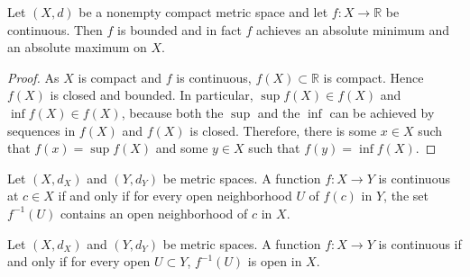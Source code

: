 \documentclass[../main.tex]{subfiles}
\begin{document}
            \begin{theorem} \label{thm:max_min_compact}
                Let \( (X, d) \) be a nonempty compact metric space and let \( f: X \to \mathbb{R} \) be continuous. Then \( f \) is bounded and in fact \( f \) achieves an absolute minimum and an absolute maximum on \( X \).
                
                \begin{proof} 
                    As \( X \) is compact and \( f \) is continuous, \( f(X) \subset \mathbb{R} \) is compact. Hence \( f(X) \) is closed and bounded. In particular, \( \sup f(X) \in f(X) \) and \( \inf f(X) \in f(X) \), because both the \(\sup\) and the \(\inf\) can be achieved by sequences in \( f(X) \) and \( f(X) \) is closed. Therefore, there is some \( x \in X \) such that \( f(x) = \sup f(X) \) and some \( y \in X \) such that \( f(y) = \inf f(X) \).
                \end{proof}
                \end{theorem}
                
                \begin{lemma} \label{lem:continuity_neighborhood}
                Let \( (X, d_X) \) and \( (Y, d_Y) \) be metric spaces. A function \( f: X \to Y \) is continuous at \( c \in X \) if and only if for every open neighborhood \( U \) of \( f(c) \) in \( Y \), the set \( f^{-1}(U) \) contains an open neighborhood of \( c \) in \( X \).
                \end{lemma}
                
                \begin{theorem} \label{thm:continuity_open_sets}
                Let \( (X, d_X) \) and \( (Y, d_Y) \) be metric spaces. A function \( f: X \to Y \) is continuous if and only if for every open \( U \subset Y \), \( f^{-1}(U) \) is open in \( X \).
                \end{theorem}
                    
\end{document}
